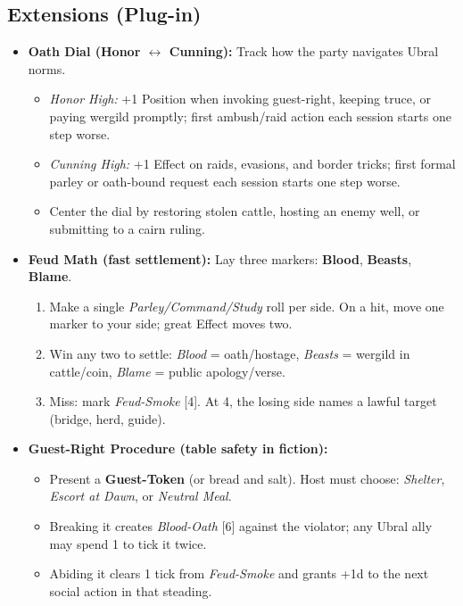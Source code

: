 \subsection*{Extensions (Plug-in)}
\label{sec:ubral-extensions}
\begin{itemize}
  \item \textbf{Oath Dial (Honor \(\leftrightarrow\) Cunning):} Track how the party navigates Ubral norms.
  \begin{itemize}
    \item \emph{Honor High:} +1 Position when invoking guest-right, keeping truce, or paying wergild promptly; first ambush/raid action each session starts one step worse.
    \item \emph{Cunning High:} +1 Effect on raids, evasions, and border tricks; first formal parley or oath-bound request each session starts one step worse.
    \item Center the dial by restoring stolen cattle, hosting an enemy well, or submitting to a cairn ruling.
  \end{itemize}

  \item \textbf{Feud Math (fast settlement):} Lay three markers: \textbf{Blood}, \textbf{Beasts}, \textbf{Blame}.
  \begin{enumerate}
    \item Make a single \emph{Parley/Command/Study} roll per side. On a hit, move one marker to your side; great Effect moves two.
    \item Win any two to settle: \emph{Blood} = oath/hostage, \emph{Beasts} = wergild in cattle/coin, \emph{Blame} = public apology/verse.
    \item Miss: mark \emph{Feud-Smoke} [4]. At 4, the losing side names a lawful target (bridge, herd, guide).
  \end{enumerate}

  \item \textbf{Guest-Right Procedure (table safety in fiction):}
  \begin{itemize}
    \item Present a \textbf{Guest-Token} (or bread and salt). Host must choose: \emph{Shelter}, \emph{Escort at Dawn}, or \emph{Neutral Meal}.
    \item Breaking it creates \emph{Blood-Oath} [6] against the violator; any Ubral ally may spend 1 \Diamond{} to tick it twice.
    \item Abiding it clears 1 tick from \emph{Feud-Smoke} and grants +1d to the next social action in that steading.
  \end{itemize}


\end{itemize}
